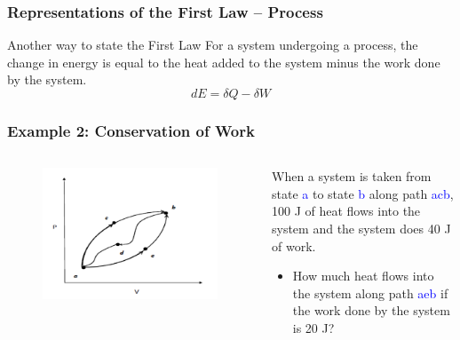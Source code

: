 \documentclass[10pt,compress,handout,ignorenonframetext]{beamer}
\begin{document}
\begin{frame}
 \frametitle{Representations of the First Law -- Process}
 \begin{block}{Another way to state the First Law} 
  For a system undergoing a process, the change in energy is equal to the heat added to the system minus the work done by the system.
  \begin{displaymath}
   dE =\delta Q - \delta W 
  \end{displaymath}
 \end{block}
\end{frame}


\begin{frame}
 \frametitle{Example 2: Conservation of Work}
 \scriptsize
 \begin{columns}
  \begin{column}[r]{0.5\linewidth}
   \begin{figure}%
    \begin{center}
     \includegraphics[width=\columnwidth,clip]{./Pics/First_Law_1}
    \end{center}
   \end{figure}
  \end{column}
  \begin{column}[r]{0.5\linewidth}
   When a system is taken from state \textcolor{blue}{a} to state \textcolor{blue}{b} along path \textcolor{blue}{acb}, 100 J of heat flows into the system and the system does 40 J of work. 
   \begin{itemize}
    \item<2-> How much heat flows into the system along path \textcolor{blue}{aeb} if the work done by the system is 20 J?\\

\end{itemize}
\end{column}
\end{columns}
\end{frame}
\end{document}
